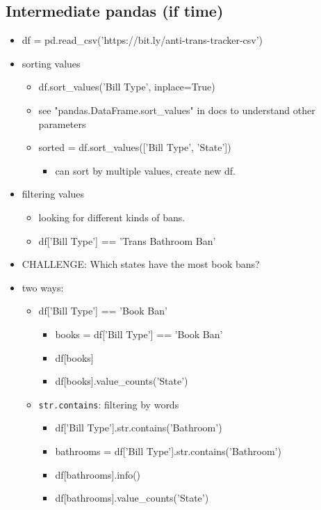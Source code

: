 \documentclass[11pt]{article}
\begin{document}
\subsection{Intermediate pandas (if time)}
\label{sec:orga6a5b66}
\begin{itemize}
\item df = pd.read\_csv('https://bit.ly/anti-trans-tracker-csv')
\item sorting values
\begin{itemize}
\item df.sort\_values('Bill Type', inplace=True)
\item see "pandas.DataFrame.sort\_values" in docs to understand other
parameters
\item sorted = df.sort\_values(['Bill Type', 'State'])
\begin{itemize}
\item can sort by multiple values, create new df.
\end{itemize}
\end{itemize}
\item filtering values
\begin{itemize}
\item looking for different kinds of bans.
\item df['Bill Type'] == 'Trans Bathroom Ban'
\end{itemize}
\item CHALLENGE: Which states have the most book bans?
\item two ways:
\begin{itemize}
\item df['Bill Type'] == 'Book Ban'
\begin{itemize}
\item books = df['Bill Type'] == 'Book Ban'
\item df[books]
\item df[books].value\_counts('State')
\end{itemize}
\item \texttt{str.contains}: filtering by words 
\begin{itemize}
\item df['Bill Type'].str.contains('Bathroom')
\item bathrooms = df['Bill Type'].str.contains('Bathroom')
\item df[bathrooms].info()
\item df[bathrooms].value\_counts('State')
\end{itemize}
\end{itemize}

\end{itemize}
\end{document}
